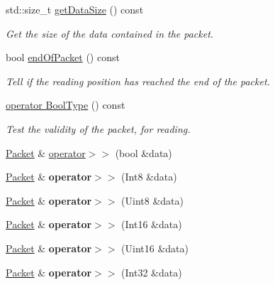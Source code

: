 \begin{DoxyCompactItemize}
std\+::size\+\_\+t \hyperlink{classsf_1_1_packet_a0fae6eccf2ca704fc5099cd90a9f56f7}{get\+Data\+Size} () const
\begin{DoxyCompactList}\small\item\em Get the size of the data contained in the packet. \end{DoxyCompactList}\item 
bool \hyperlink{classsf_1_1_packet_a61e354fa670da053907c14b738839560}{end\+Of\+Packet} () const
\begin{DoxyCompactList}\small\item\em Tell if the reading position has reached the end of the packet. \end{DoxyCompactList}\item 
\hyperlink{classsf_1_1_packet_a8ab20be4a63921b7cb1a4d8ca5c30f75}{operator Bool\+Type} () const
\begin{DoxyCompactList}\small\item\em Test the validity of the packet, for reading. \end{DoxyCompactList}\item 
\hyperlink{classsf_1_1_packet}{Packet} \& \hyperlink{classsf_1_1_packet_af8e26c63ba9bdccd262565ff0d3eeba2}{operator$>$$>$} (bool \&data)
\item 
\mbox{\label{classsf_1_1_packet_a70fd5abb9095b5335b79c0cefd17b222}} 
\hyperlink{classsf_1_1_packet}{Packet} \& {\bfseries operator$>$$>$} (Int8 \&data)
\item 
\mbox{\label{classsf_1_1_packet_aa67738284a7efc16c7594b358ef35510}} 
\hyperlink{classsf_1_1_packet}{Packet} \& {\bfseries operator$>$$>$} (Uint8 \&data)
\item 
\mbox{\label{classsf_1_1_packet_af82d6c4e6d74f2ca39732c1e29f30781}} 
\hyperlink{classsf_1_1_packet}{Packet} \& {\bfseries operator$>$$>$} (Int16 \&data)
\item 
\mbox{\label{classsf_1_1_packet_afd8706f092bc830ebb438aeee9271647}} 
\hyperlink{classsf_1_1_packet}{Packet} \& {\bfseries operator$>$$>$} (Uint16 \&data)
\item 
\mbox{\label{classsf_1_1_packet_ae7b44e79f12d500b63f5dc2a10d78d8c}} 
\hyperlink{classsf_1_1_packet}{Packet} \& {\bfseries operator$>$$>$} (Int32 \&data)

\end{DoxyCompactItemize}
